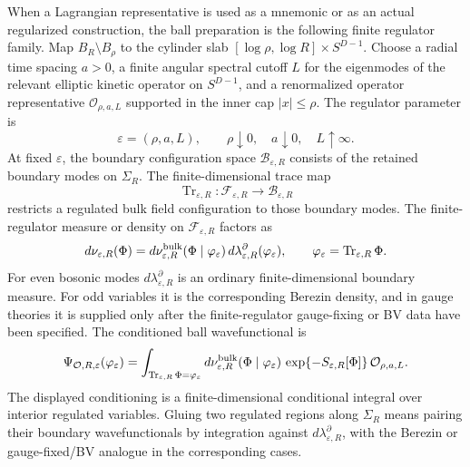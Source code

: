 \begin{definition}
\label{def:regulated-ball-preparation}
When a Lagrangian representative is used as a mnemonic or as an actual
regularized construction, the ball preparation is the following finite
regulator family.  Map \(B_R\setminus B_\rho\) to the cylinder slab
\([\log\rho,\log R]\times S^{D-1}\).  Choose a radial time spacing \(a>0\),
a finite angular spectral cutoff \(L\) for the eigenmodes of the relevant
elliptic kinetic operator on \(S^{D-1}\), and a renormalized operator
representative \(\mathcal O_{\rho,a,L}\) supported in the inner cap
\(|x|\le\rho\).  The regulator parameter is
\begin{equation}
  \varepsilon=(\rho,a,L),
  \qquad
  \rho\downarrow0,\quad a\downarrow0,\quad L\uparrow\infty .
  \label{eq:radial-ball-regulator-parameter}
\end{equation}
At fixed \(\varepsilon\), the boundary configuration space
\(\mathcal B_{\varepsilon,R}\) consists of the retained boundary modes on
\(\Sigma_R\).  The finite-dimensional trace map
\[
  \operatorname{Tr}_{\varepsilon,R}:
  \mathcal F_{\varepsilon,R}\longrightarrow \mathcal B_{\varepsilon,R}
\]
restricts a regulated bulk field configuration to those boundary modes.  The
finite-regulator measure or density on \(\mathcal F_{\varepsilon,R}\) factors
as
\begin{equation}
  d\nu_{\varepsilon,R}(\Phi)
  =
  d\nu_{\varepsilon,R}^{\rm bulk}
    (\Phi\mid\varphi_\varepsilon)\,
  d\lambda_{\varepsilon,R}^{\partial}(\varphi_\varepsilon),
  \qquad
  \varphi_\varepsilon=
  \operatorname{Tr}_{\varepsilon,R}\Phi .
  \label{eq:radial-ball-boundary-factorization}
\end{equation}
For even bosonic modes \(d\lambda_{\varepsilon,R}^{\partial}\) is an ordinary
finite-dimensional boundary measure.  For odd variables it is the
corresponding Berezin density, and in gauge theories it is supplied only
after the finite-regulator gauge-fixing or BV data have been specified.  The
conditioned ball wavefunctional is
\begin{equation}
  \Psi_{\mathcal O,R,\varepsilon}(\varphi_\varepsilon)
  =
  \int_{\operatorname{Tr}_{\varepsilon,R}\Phi=\varphi_\varepsilon}
  d\nu_{\varepsilon,R}^{\rm bulk}(\Phi\mid\varphi_\varepsilon)\,
  \exp\{-S_{\varepsilon,R}[\Phi]\}\,
  \mathcal O_{\rho,a,L} .
  \label{eq:regulated-ball-wavefunctional}
\end{equation}
The displayed conditioning is a finite-dimensional conditional integral over
interior regulated variables.  Gluing two regulated regions along
\(\Sigma_R\) means pairing their boundary wavefunctionals by integration
against \(d\lambda_{\varepsilon,R}^{\partial}\), with the Berezin or
gauge-fixed/BV analogue in the corresponding cases.


\end{definition}

